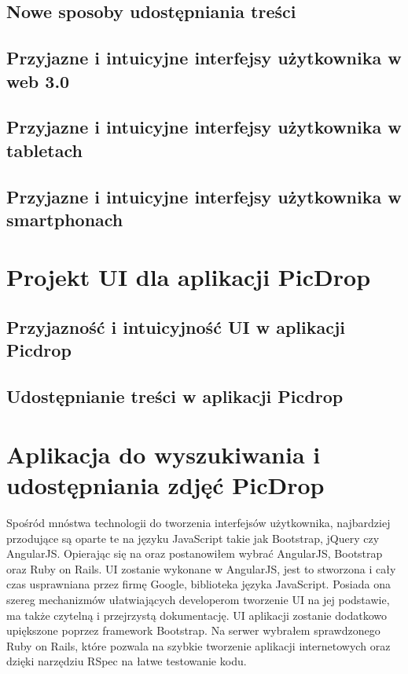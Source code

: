 \documentclass[brudnopis]{xmgr}
\begin{document}
\section{Nowe sposoby udostępniania treści}

\section{Przyjazne i intuicyjne interfejsy użytkownika w web 3.0}

\section{Przyjazne i intuicyjne interfejsy użytkownika w tabletach}

\section{Przyjazne i intuicyjne interfejsy użytkownika w smartphonach}

\chapter{Projekt UI dla aplikacji PicDrop}

\section{Przyjazność i intuicyjność  UI w aplikacji Picdrop}

\section{Udostępnianie treści w aplikacji Picdrop}

\chapter{Aplikacja do wyszukiwania i udostępniania zdjęć PicDrop}

Spośród mnóstwa technologii do tworzenia interfejsów użytkownika, najbardziej przodujące są oparte te na języku JavaScript takie jak Bootstrap, jQuery czy AngularJS. Opierając się na \cite{adamAnderson} oraz \cite{angularRailsBootstrap} postanowiłem wybrać AngularJS, Bootstrap oraz Ruby on Rails. UI zostanie wykonane w AngularJS, jest to stworzona i cały czas usprawniana przez firmę Google, biblioteka języka JavaScript. Posiada ona szereg mechanizmów ułatwiających developerom tworzenie UI na jej podstawie, ma także czytelną i przejrzystą dokumentację. UI aplikacji zostanie dodatkowo upiększone poprzez framework Bootstrap. Na serwer  wybrałem sprawdzonego Ruby on Rails, które pozwala na szybkie tworzenie aplikacji internetowych oraz dzięki narzędziu RSpec na łatwe testowanie kodu. 
\end{document}
